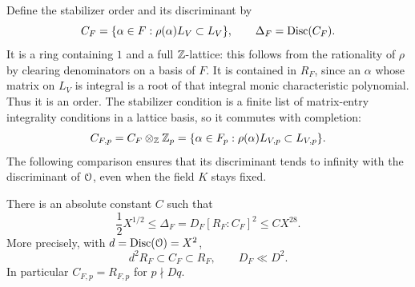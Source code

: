 Define the stabilizer order and its discriminant by
\begin{equation}
 C_F=\{\alpha\in F:\rho(\alpha)L_V\subset L_V\},\qquad
 \Delta_F=\operatorname{Disc}(C_F).
 \label{eq:ext-stabilizer-order}
\end{equation}
It is a ring containing \(1\) and a full \(\mathbb Z\)-lattice: this follows
from the rationality of \(\rho\) by clearing denominators on a basis
of \(F\).  It is contained in \(R_F\), since an \(\alpha\) whose
matrix on \(L_V\) is integral is a root of that integral monic
characteristic polynomial.  Thus it is an order.
The stabilizer condition is a finite list of matrix-entry integrality
conditions in a lattice basis, so it commutes with completion:
\begin{equation}
 C_{F,p}=C_F\otimes_\mathbb Z\mathbb Z_p
   =\{\alpha\in F_p:\rho(\alpha)L_{V,p}\subset L_{V,p}\}.
 \label{eq:ext-local-stabilizer}
\end{equation}
The following comparison ensures that its discriminant tends to infinity
with the discriminant of \(\mathcal O\), even when the field \(K\) stays fixed.

\begin{lemma}
\label{lem:ext-order-scale}
There is an absolute constant \(C\) such that
\begin{equation}
 \frac12 X^{1/2}\le
 \Delta_F=D_F[R_F:C_F]^2\le C X^{28}.
 \label{eq:ext-order-scale}
\end{equation}
More precisely, with \(d=\operatorname{Disc}(\mathcal O)=X^2\),
\[
 d^2R_F\subset C_F\subset R_F,\qquad D_F\ll D^2.
\]
In particular \(C_{F,p}=R_{F,p}\) for \(p\nmid Dq\).
\end{lemma}

